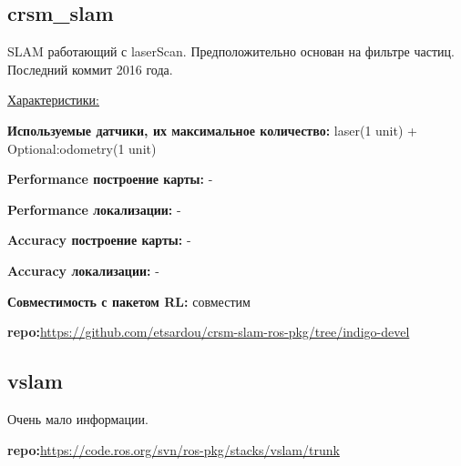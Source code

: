 \documentclass[a4paper, 14pt]{extreport}
\begin{document}
\subsection{crsm\_slam}
\par SLAM работающий с laserScan. Предположительно основан на фильтре частиц. Последний коммит 2016 года.
\vspace{2mm}
\par\noindent \underline{Характеристики:}
\par\textbf{Используемые датчики, их максимальное количество:} laser(1 unit) + Optional:odometry(1 unit)
\par\textbf{Performance построение карты:} -
\par\textbf{Performance локализации:} -
\par\textbf{Accuracy построение карты:} -
\par\textbf{Accuracy локализации:} -
\par\textbf{Совместимость с пакетом RL:} совместим
\par\textbf{repo:}\url{https://github.com/etsardou/crsm-slam-ros-pkg/tree/indigo-devel}
\subsection{vslam}
\par Очень мало информации.
\par\textbf{repo:}\url{https://code.ros.org/svn/ros-pkg/stacks/vslam/trunk}
\end{document}
